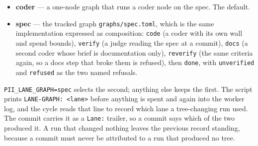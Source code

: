 \begin{itemize}
	\item \textbf{coder} --- a one-node graph that runs a coder node on the spec. The default.
	\item \textbf{spec} --- the tracked graph \texttt{graphs/spec.toml}, which is the same
	implementation expressed as composition: \texttt{code} (a coder with its own wall and spend
	bounds), \texttt{verify} (a judge reading the spec at a commit), \texttt{docs} (a second
	coder whose brief is documentation only), \texttt{reverify} (the same criteria again, so a
	docs step that broke them is refused), then \texttt{done}, with \texttt{unverified} and
	\texttt{refused} as the two named refusals.
\end{itemize}

\texttt{PII\_LANE\_GRAPH=spec} selects the second; anything else keeps the first. The script
prints \texttt{LANE-GRAPH: <lane>} before anything is spent and again into the worker log, and
the cycle reads that line to record which lane a tree-changing run used. The commit carries it
as a \texttt{Lane:} trailer, so a commit says which of the two produced it. A run that changed
nothing leaves the previous record standing, because a commit must never be attributed to a
run that produced no tree.

\begin{center}
\end{center}

